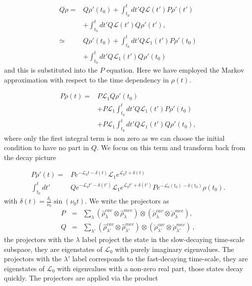 \documentclass[reprint, amsmath,amssymb, aps,pra]{revtex4-1}
\begin{document}
\begin{align*}
Q\rho =& Q\rho'(t_0) + \int_{t_0}^{t}dt' Q\mathcal{L}(t')P\rho'(t')\\
       &+\int_{t_0}^{t}dt'Q\mathcal{L}(t')Q\rho'(t'),\\
\simeq & Q\rho'(t_0) + \int_{t_0}^{t}dt' Q\mathcal{L}_1(t')P\rho'(t_0)\\
       &+\int_{t_0}^{t}dt'Q\mathcal{L}_1(t')Q\rho'(t_0)
\end{align*}
and this is substituted into the $P$ equation. Here we have employed the Markov approximation with respect to the time dependency in $\rho(t)$.

\begin{align}
P\dot{\rho}(t) =& P\mathcal{L}_1Q\rho'(t_0)\\ 
 &+ P\mathcal{L}_1\int_{t_0}^{t}dt' Q\mathcal{L}_1(t')P\rho'(t_0)\nonumber \\
 &+ P\mathcal{L}_1\int_{t_0}^{t}dt'Q\mathcal{L}_1(t')Q\rho'(t_0)\nonumber,
\end{align}
where only the first integral term is non zero as we can choose the initial condition to have no part in $Q$. We focus on this term and transform back from the decay
picture


\begin{align}\label{eq:temp_1}
P\dot{\rho}'(t)=&P e^{-\mathcal{L}_0 t-\delta(t)}\mathcal{L}_1e^{\mathcal{L}_0 t+\delta(t)}\\
\int_{t_0}^{t}dt'&Qe^{-\mathcal{L}_0 t'-\delta(t')}\mathcal{L}_1e^{\mathcal{L}_0 t'+\delta(t')}Pe^{-\mathcal{L}_0(t_0)-\delta(t_0)}\rho(t_0).\nonumber
\end{align} with $\delta(t)=\frac{\delta_t}{\nu_0} \sin(\nu_0t)$. We write the projectors as
\begin{eqnarray}
  P &=& \sum_{\lambda} (\hat{\rho}_{\lambda}^{cav}\otimes\hat{\rho}_{\lambda}^{mec})\otimes(\check{\rho}_{\lambda}^{cav}\otimes\check{\rho}_{\lambda}^{mec}),\label{eq:projector_p}\\
  Q &=& \sum_{\lambda'} (\hat{\rho}_{\lambda'}^{cav}\otimes \hat{\rho}_{\lambda'}^{mec})\otimes(\check{\rho}_{\lambda'}^{cav}\otimes\check{\rho}_{\lambda'}^{mec})\label{eq:projector_q}\, ,
\end{eqnarray}
the projectors with the $\lambda$ label project the state in the
slow-decaying time-scale subspace, they are eigenstates of
$\mathcal{L}_0$ with purely imaginary  eigenvalues. The projectors with the
$\lambda'$ label corresponds to the fast-decaying time-scale, they are
eigenstates of $\mathcal{L}_0$ with eigenvalues with a non-zero real
part, those states decay quickly. The projectors are applied via the product
\end{document}
